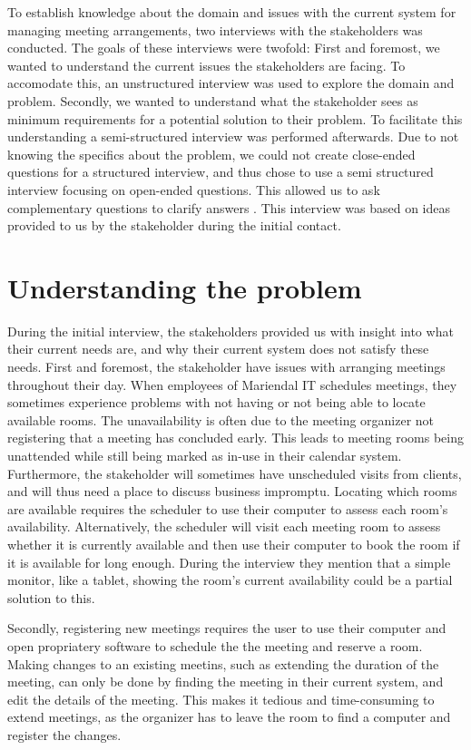 To establish knowledge about the domain and issues with the current system for managing meeting arrangements, two interviews with the stakeholders was conducted.  
The goals of these interviews were twofold: 
First and foremost, we wanted  to understand the current issues the stakeholders are facing. 
To accomodate this, an unstructured interview was used to explore the domain and problem\cite{robson2002real}.
Secondly, we wanted to understand what the stakeholder sees as minimum requirements for a potential solution to their problem. 
To facilitate this understanding a semi-structured interview was performed afterwards. 
Due to not knowing the specifics about the problem, we could not create close-ended questions for a structured interview, and thus chose to use a semi structured interview focusing on open-ended questions. This allowed us to ask complementary questions to clarify answers \cite{InterviewsNHS}.
This interview was based on ideas provided to us by the stakeholder during the initial contact.


\section{Understanding the problem} %
During the initial interview, the stakeholders provided us with insight into what their current needs are, and why their current system does not satisfy these needs.
First and foremost, the stakeholder have issues with arranging meetings throughout their day.
When employees of Mariendal IT schedules meetings, they sometimes experience problems with not having or not being able to locate available rooms.
The unavailability is often due to the meeting organizer not registering that a meeting has concluded early.
This leads to meeting rooms being unattended while still being marked as in-use in their calendar system.
Furthermore, the stakeholder will sometimes have unscheduled visits from clients, and will thus need a place to discuss business impromptu. 
Locating which rooms are available requires the scheduler to use their computer to assess each room's availability.
Alternatively, the scheduler will visit each meeting room to assess whether it is currently available and then use their computer to book the room if it is available for long enough.
During the interview they mention that a simple monitor, like a tablet, showing the room's current availability could be a partial solution to this.

Secondly, registering new meetings requires the user to use their computer and open propriatery software to schedule the the meeting and reserve a room. Making changes to an existing meetins, such as extending the duration of the meeting, can only be done by finding the meeting in their current system, and edit the details of the meeting.
This makes it tedious and time-consuming to extend meetings, as the organizer has to leave the room to find a computer and register the changes.

